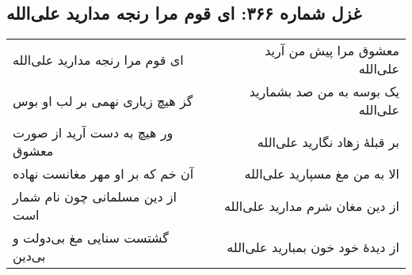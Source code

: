 \begin{center}
\section*{غزل شماره ۳۶۶: ای قوم مرا رنجه مدارید علی‌الله}
\label{sec:366}
\begin{longtable}{l p{0.5cm} r}
ای قوم مرا رنجه مدارید علی‌الله
&&
معشوق مرا پیش من آرید علی‌الله
\\
گز هیچ زیاری نهمی بر لب او بوس
&&
یک بوسه به من صد بشمارید علی‌الله
\\
ور هیچ به دست آرید از صورت معشوق
&&
بر قبلهٔ زهاد نگارید علی‌الله
\\
آن خم که بر او مهر مغانست نهاده
&&
الا به من مغ مسپارید علی‌الله
\\
از دین مسلمانی چون نام شمار است
&&
از دین مغان شرم مدارید علی‌الله
\\
گشتست سنایی مغ بی‌دولت و بی‌دین
&&
از دیدهٔ خود خون بمبارید علی‌الله
\\
\end{longtable}
\end{center}
